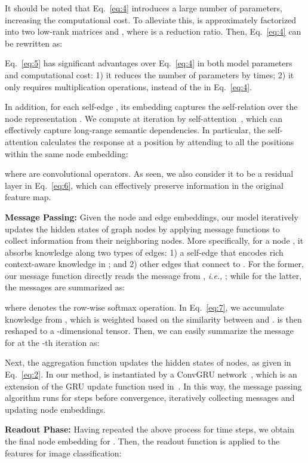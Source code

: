 \documentclass[letterpaper]{article} \usepackage{aaai21}  \usepackage{times}  \usepackage{helvet} \usepackage{courier}  \usepackage[hyphens]{url}  \usepackage{graphicx} \urlstyle{rm} \def\UrlFont{\rm}  \usepackage{graphicx}  \usepackage{natbib}  \usepackage{caption} \frenchspacing  \setlength{\pdfpagewidth}{8.5in}  \setlength{\pdfpageheight}{11in}
\newcommand{\ie}[1]{\textit{i.e.,}}
\begin{document}
It should be noted that Eq.~\eqref{eq:4} introduces a large number of parameters, increasing the computational cost. To alleviate this,  is approximately factorized into two low-rank matrices  and , where  is a reduction ratio. Then, Eq.~\eqref{eq:4} can be rewritten as:

Eq.~\eqref{eq:5} has significant advantages over Eq.~\eqref{eq:4} in both model parameters and computational cost: 1) it reduces the number of parameters by  times; 2) it only requires  multiplication operations, instead of the  in Eq.~\eqref{eq:4}. 

In addition, for each self-edge , its embedding  captures the self-relation over the node representation . We compute  at iteration  by self-attention~\cite{vaswani2017attention,wang2018non}, which can effectively capture long-range semantic dependencies. In particular, the self-attention calculates the response at a position by attending to all the positions within the same node embedding:

where  are  convolutional operators. As seen, we also consider it to be a residual layer in Eq.~\eqref{eq:6}, which can effectively preserve information in the original feature map.

\noindent\textbf{Message Passing:}
Given the node and edge embeddings, our model iteratively updates the hidden states of graph nodes by applying message functions to collect information from their neighboring nodes. More specifically, for a node , it absorbs knowledge along two types of edges: 1) a self-edge  that encodes rich context-aware knowledge in ; and 2) other edges  that connect  to . For the former, our message function directly reads the message from , \ie, ; while for the latter, the messages are summarized as: 

where  denotes the row-wise softmax operation. In Eq.\!~\eqref{eq:7}, we accumulate knowledge from , which is weighted based on the similarity between  and .  is then reshaped to a -dimensional tensor. Then, we can easily summarize the message for  at  the -th iteration as:


Next, the aggregation function  updates the hidden states of nodes, as given in Eq.\!~\eqref{eq:2}. In our method,  is instantiated by a ConvGRU network~\cite{ballas2015delving}, which is an extension of the GRU update function used in~\cite{gilmer2017neural}. In this way, the message passing algorithm runs for  steps before convergence, iteratively collecting messages and updating node embeddings.

\noindent\textbf{Readout Phase:}
Having repeated the above process for  time steps, we obtain the final node embedding  for . Then, the readout function  is applied to the features  for image classification:
\end{document}
